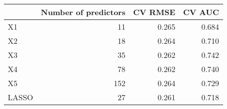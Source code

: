 
\begin{tabular}{lrrr}
\toprule
  & Number of predictors & CV RMSE & CV AUC\\
\midrule
X1 & 11 & 0.265 & 0.684\\
X2 & 18 & 0.264 & 0.710\\
X3 & 35 & 0.262 & 0.742\\
X4 & 78 & 0.262 & 0.740\\
X5 & 152 & 0.264 & 0.729\\
LASSO & 27 & 0.261 & 0.718\\
\bottomrule
\end{tabular}